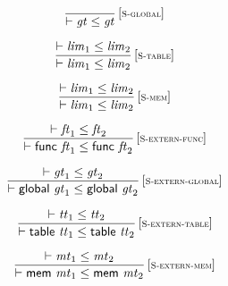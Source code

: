 $$
\begin{array}{@{}c@{}}\displaystyle
\frac{
}{
{ \vdash }\;{\mathit{gt}} \leq {\mathit{gt}}
} \, {[\textsc{\scriptsize S{-}global}]}
\qquad
\end{array}
$$

$$
\begin{array}{@{}c@{}}\displaystyle
\frac{
{ \vdash }\;{\mathit{lim}}_{{1}} \leq {\mathit{lim}}_{{2}}
}{
{ \vdash }\;{\mathit{lim}}_{{1}} \leq {\mathit{lim}}_{{2}}
} \, {[\textsc{\scriptsize S{-}table}]}
\qquad
\end{array}
$$

$$
\begin{array}{@{}c@{}}\displaystyle
\frac{
{ \vdash }\;{\mathit{lim}}_{{1}} \leq {\mathit{lim}}_{{2}}
}{
{ \vdash }\;{\mathit{lim}}_{{1}} \leq {\mathit{lim}}_{{2}}
} \, {[\textsc{\scriptsize S{-}mem}]}
\qquad
\end{array}
$$

\vspace{1ex}

$$
\begin{array}{@{}c@{}}\displaystyle
\frac{
{ \vdash }\;{\mathit{ft}}_{{1}} \leq {\mathit{ft}}_{{2}}
}{
{ \vdash }\;\mathsf{func}~{\mathit{ft}}_{{1}} \leq \mathsf{func}~{\mathit{ft}}_{{2}}
} \, {[\textsc{\scriptsize S{-}extern{-}func}]}
\qquad
\end{array}
$$

$$
\begin{array}{@{}c@{}}\displaystyle
\frac{
{ \vdash }\;{\mathit{gt}}_{{1}} \leq {\mathit{gt}}_{{2}}
}{
{ \vdash }\;\mathsf{global}~{\mathit{gt}}_{{1}} \leq \mathsf{global}~{\mathit{gt}}_{{2}}
} \, {[\textsc{\scriptsize S{-}extern{-}global}]}
\qquad
\end{array}
$$

$$
\begin{array}{@{}c@{}}\displaystyle
\frac{
{ \vdash }\;{\mathit{tt}}_{{1}} \leq {\mathit{tt}}_{{2}}
}{
{ \vdash }\;\mathsf{table}~{\mathit{tt}}_{{1}} \leq \mathsf{table}~{\mathit{tt}}_{{2}}
} \, {[\textsc{\scriptsize S{-}extern{-}table}]}
\qquad
\end{array}
$$

$$
\begin{array}{@{}c@{}}\displaystyle
\frac{
{ \vdash }\;{\mathit{mt}}_{{1}} \leq {\mathit{mt}}_{{2}}
}{
{ \vdash }\;\mathsf{mem}~{\mathit{mt}}_{{1}} \leq \mathsf{mem}~{\mathit{mt}}_{{2}}
} \, {[\textsc{\scriptsize S{-}extern{-}mem}]}
\qquad
\end{array}
$$

